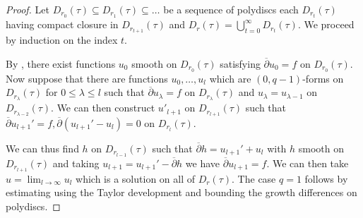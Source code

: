 \begin{proof}
    Let $D_{r_{0}}(\tau)\subseteq D_{r_{1}}(\tau)\subseteq\dots$ be a sequence of polydiscs each $D_{r_{t}}(\tau)$ having compact closure in $D_{r_{t+1}}(\tau)$ and $D_{r}(\tau)=\bigcup_{t=0}^{\infty}D_{r_{t}}(\tau)$. We proceed by induction on the index $t$. 

    By , there exist functions $u_{0}$ smooth on $D_{r_{0}}(\tau)$ satisfying $\overline{\partial}u_{0}=f$ on $D_{r_{0}}(\tau)$. Now suppose that there are functions $u_{0},\dots,u_{l}$ which are $(0,q-1)$-forms on $D_{r_{\lambda}}(\tau)$ for $0\leq\lambda\leq l$ such that $\overline{\partial}u_{\lambda}=f$ on $D_{r_{\lambda}}(\tau)$ and $u_{\lambda}=u_{\lambda-1}$ on $D_{r_{\lambda-2}}(\tau)$. We can then construct $u'_{l+1}$ on $D_{r_{l+1}}(\tau)$ such that $\overline{\partial}u_{l+1}'=f, \overline{\partial}(u_{l+1}'-u_{l})=0$ on $D_{r_{l}}(\tau)$. 

    We can thus find $h$ on $D_{r_{l-1}}(\tau)$ such that $\overline{\partial}h=u_{l+1}'+u_{l}$ with $h$ smooth on $D_{r_{l+1}}(\tau)$ and taking $u_{l+1}=u_{l+1}'-\overline{\partial}h$ we have $\overline{\partial}u_{l+1}=f$. We can then take $u=\lim_{l\to\infty}u_{l}$ which is a solution on all of $D_{r}(\tau)$. The case $q=1$ follows by estimating using the Taylor development and bounding the growth differences on polydiscs. 
\end{proof}